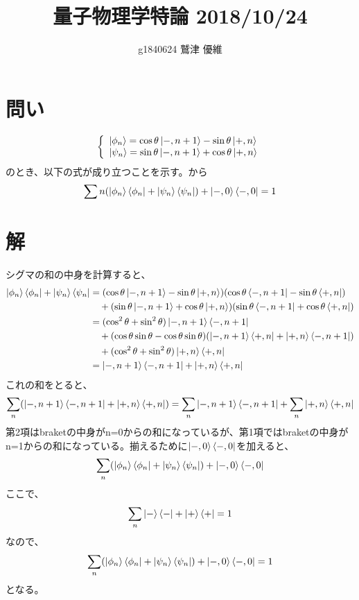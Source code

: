 \documentclass[10pt]{ujarticle}
\title{量子物理学特論 2018/10/24}
\author{g1840624 鷲津 優維}
\date{}
\begin{document}
\maketitle
\section{問い}
\[
\left\{
\begin{array}{l}
  \ket{\phi_n} = \cos\theta \ket{-, n+1} - \sin\theta \ket{+, n}\\
  \ket{\psi_n} = \sin\theta \ket{-, n+1} + \cos\theta \ket{+, n}
  \end{array}
\right.
\]
のとき、以下の式が成り立つことを示す。から
\begin{eqnarray*}
\sum{n} (\ket{\phi_n} \bra{\phi_n} +\ket{\psi_n} \bra{\psi_n}) + \ket{-, 0} \bra{-, 0} = 1
\end{eqnarray*}

\section{解}
シグマの和の中身を計算すると、
\begin{eqnarray*}
\begin{split}
\ket{\phi_n} \bra{\phi_n} +\ket{\psi_n} \bra{\psi_n} &= (\cos\theta \ket{-, n+1} - \sin\theta \ket{+, n})(\cos\theta \bra{-, n+1} - \sin\theta \bra{+, n}) \\
&\quad+ (\sin\theta \ket{-, n+1} + \cos\theta \ket{+, n})(\sin\theta \bra{-, n+1} + \cos\theta \bra{+, n}) \\
&= (\cos^2\theta + \sin^2\theta) \ket{-, n+1} \bra{-, n+1} \\
&\quad + (\cos\theta\sin\theta-\cos\theta\sin\theta)(\ket{-, n+1}\bra{+, n} + \ket{+, n} \bra{-, n+1}) \\
&\quad + (\cos^2\theta + \sin^2\theta) \ket{+, n} \bra{+, n} \\
&= \ket{-, n+1} \bra{-, n+1} + \ket{+, n} \bra{+, n}
\end{split}
\end{eqnarray*}
これの和をとると、
\begin{eqnarray*}
\sum_{n} (\ket{-, n+1} \bra{-, n+1} + \ket{+, n} \bra{+, n}) = \sum_{n} \ket{-, n+1} \bra{-, n+1} + \sum_{n} \ket{+, n} \bra{+, n}
\end{eqnarray*}
第2項はbraketの中身がn=0からの和になっているが、第1項ではbraketの中身がn=1からの和になっている。揃えるために$\ket{-, 0} \bra{-, 0}$を加えると、
\begin{eqnarray*}
\sum_{n} (\ket{\phi_n} \bra{\phi_n} +\ket{\psi_n} \bra{\psi_n}) + \ket{-, 0} \bra{-, 0} 
\end{eqnarray*}
ここで、
\begin{eqnarray*}
\sum_{n} \ket{-} \bra{-} + \ket{+} \bra{+} = 1
\end{eqnarray*}
なので、
\begin{eqnarray*}
\sum_{n} (\ket{\phi_n} \bra{\phi_n} +\ket{\psi_n} \bra{\psi_n}) + \ket{-, 0} \bra{-, 0} = 1
\end{eqnarray*}
となる。
\end{document}
